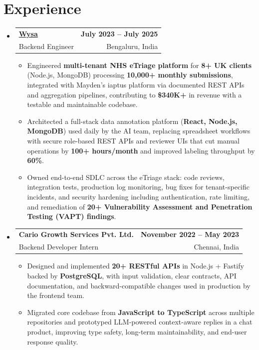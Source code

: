 \documentclass[letterpaper,10pt]{article}
\makeatletter
\newcommand{\resumeItem}[1]{
  \item\small{#1\vspace{-1pt}}
}
\newcommand{\resumeSubheading}[4]{
  \vspace{1pt}\item
    \begin{tabular*}{0.985\textwidth}[t]{l@{\extracolsep{\fill}}r}
      \textbf{#1} & \textbf{\small #2} \\
      {\small\color{ResumeSlate} #3} & {\small\color{ResumeSlate} #4} \\
    \end{tabular*}\vspace{-6pt}
}
\newcommand{\resumeSubHeadingListStart}{\begin{itemize}[leftmargin=0.0in, label={}, itemsep=2pt, topsep=2pt]}
\newcommand{\resumeSubHeadingListEnd}{\end{itemize}}
\newcommand{\resumeItemListStart}{\begin{itemize}[leftmargin=0.18in, itemsep=2pt, topsep=1pt]}
\newcommand{\resumeItemListEnd}{\end{itemize}\vspace{-4pt}}
\makeatother
\begin{document}
\section{Experience}
\resumeSubHeadingListStart
  \resumeSubheading
    {\href{https://www.wysa.io}{Wysa}}{July 2023 -- July 2025}
    {Backend Engineer}{Bengaluru, India}
    \resumeItemListStart
      \resumeItem{Engineered \textbf{multi-tenant NHS eTriage platform} for \textbf{8+ UK clients} (Node.js, MongoDB) processing \textbf{10{,}000+ monthly submissions}, integrated with Mayden's iaptus platform via documented REST APIs and aggregation pipelines, contributing to \textbf{\$340K+} in revenue with a testable and maintainable codebase.}
      \resumeItem{Architected a full-stack data annotation platform (\textbf{React, Node.js, MongoDB}) used daily by the AI team, replacing spreadsheet workflows with secure role-based REST APIs and reviewer UIs that cut manual operations by \textbf{100+ hours/month} and improved labeling throughput by \textbf{60\%}.}
      \resumeItem{Owned end-to-end SDLC across the eTriage stack: code reviews, integration tests, production log monitoring, bug fixes for tenant-specific incidents, and security hardening including authentication, rate limiting, and remediation of \textbf{20+ Vulnerability Assessment and Penetration Testing (VAPT) findings}.}
    \resumeItemListEnd
  \resumeSubheading
    {Cario Growth Services Pvt. Ltd.}{November 2022 -- May 2023}
    {Backend Developer Intern}{Chennai, India}
    \resumeItemListStart
      \resumeItem{Designed and implemented \textbf{20+ RESTful APIs} in Node.js + Fastify backed by \textbf{PostgreSQL}, with input validation, clear contracts, API documentation, and backward-compatible changes used in production by the frontend team.}
      \resumeItem{Migrated core codebase from \textbf{JavaScript to TypeScript} across multiple repositories and prototyped LLM-powered context-aware replies in a chat product, improving type safety, long-term maintainability, and end-user response quality.}
    \resumeItemListEnd
\resumeSubHeadingListEnd
\vspace{-4pt}
\end{document}
